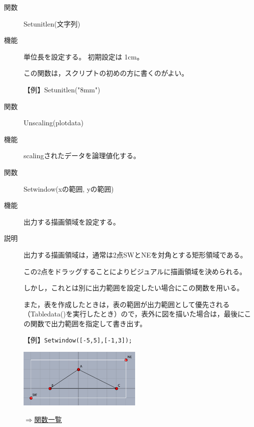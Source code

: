 \documentclass[papersize,a4paper,12pt,uplatex]{jsarticle}
\begin{document}
\begin{description}
\vspace{\baselineskip}
\hypertarget{setunitlen}{}
\item[関数]Setunitlen(文字列)
\item[機能]単位長を設定する。 初期設定は 1cm。

この関数は，スクリプトの初めの方に書くのがよい。

【例】Setunitlen("8mm")

\vspace{\baselineskip}

\hypertarget{unscaling}{}
\item[関数]Unscaling(plotdata)
\item[機能]scalingされたデータを論理値化する。

\vspace{\baselineskip}
\hypertarget{setwindow}{}
\item[関数]Setwindow(xの範囲, yの範囲)
\item[機能]出力する描画領域を設定する。
\item[説明]出力する描画領域は，通常は2点SWとNEを対角とする矩形領域である。

この2点をドラッグすることによりビジュアルに描画領域を決められる。

しかし，これとは別に出力範囲を設定したい場合にこの関数を用いる。

また，表を作成したときは，表の範囲が出力範囲として優先される（Tabledata()を実行したとき）ので，表外に図を描いた場合は，最後にこの関数で出力範囲を指定して書き出す。

\vspace{\baselineskip}
【例】\verb|Setwindow([-5,5],[-1,3]);|

\vspace{\baselineskip}
\hspace{10mm}\includegraphics[bb=0.00 0.00 415.02 199.01,width=6cm]{Fig/setwindow.pdf} 

\begin{flushright}\hyperlink{functionlist}{$\Rightarrow$関数一覧}\end{flushright}

\end{description}

\end{document}
